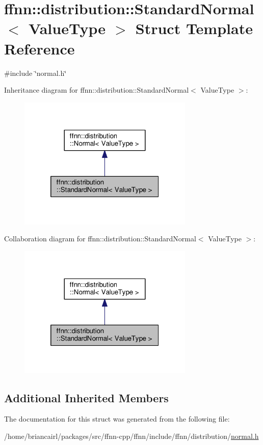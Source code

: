 \hypertarget{structffnn_1_1distribution_1_1_standard_normal}{\section{ffnn\-:\-:distribution\-:\-:Standard\-Normal$<$ Value\-Type $>$ Struct Template Reference}
\label{structffnn_1_1distribution_1_1_standard_normal}
}


{\ttfamily \#include \char`\"{}normal.\-h\char`\"{}}



Inheritance diagram for ffnn\-:\-:distribution\-:\-:Standard\-Normal$<$ Value\-Type $>$\-:\nopagebreak
\begin{figure}[H]
\begin{center}
\leavevmode
\includegraphics[width=236pt]{structffnn_1_1distribution_1_1_standard_normal__inherit__graph}
\end{center}
\end{figure}


Collaboration diagram for ffnn\-:\-:distribution\-:\-:Standard\-Normal$<$ Value\-Type $>$\-:\nopagebreak
\begin{figure}[H]
\begin{center}
\leavevmode
\includegraphics[width=236pt]{structffnn_1_1distribution_1_1_standard_normal__coll__graph}
\end{center}
\end{figure}
\subsection*{Additional Inherited Members}


The documentation for this struct was generated from the following file\-:\begin{DoxyCompactItemize}
\item 
/home/briancairl/packages/src/ffnn-\/cpp/ffnn/include/ffnn/distribution/\hyperlink{normal_8h}{normal.\-h}\end{DoxyCompactItemize}
